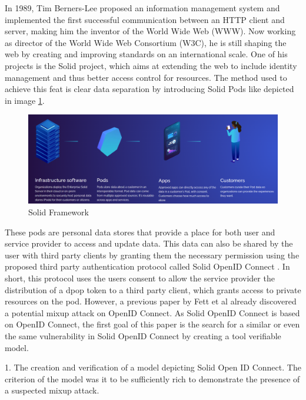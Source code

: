 \documentclass[11pt,twoside,a4paper,openright]{book}
\begin{document}
In 1989, Tim Berners-Lee proposed an information management system and implemented the first successful communication between an HTTP client and server, making him the inventor of the World Wide Web (WWW). Now working as director of the World Wide Web Consortium (W3C), he is still shaping the web by creating and improving standards on an international scale. One of his projects is the Solid project, which aims at extending the web to include identity management and thus better access control for resources. The method used to achieve this feat is clear data separation by introducing Solid Pods like depicted in image \ref{fig:solidImage}.

\begin{figure}[H]
    \centering
    \includegraphics[width=\textwidth]{images/solid.png}
    \caption{Solid Framework \cite{solidImage}}
    \label{fig:solidImage}
\end{figure}

These pods are personal data stores that provide a place for both user and service provider to access and update data. This data can also be shared by the user with third party clients by granting them the necessary permission using the proposed third party authentication protocol called Solid OpenID Connect \cite{solidWebsite}. In short, this protocol uses the users consent to allow the service provider the distribution of a dpop token to a third party client, which grants access to private resources on the pod. However, a previous paper by Fett et al \cite{fett2016comprehensive} already discovered a potential mixup attack on OpenID Connect. As Solid OpenID Connect is based on OpenID Connect, the first goal of this paper is the search for a similar or even the same vulnerability in Solid OpenID Connect by creating a tool verifiable model.

\begin{mdframed}
1. The creation and verification of a model depicting Solid Open ID Connect. The criterion of the model was it to be sufficiently rich to demonstrate the presence of a suspected mixup attack.
\end{mdframed}
\end{document}
